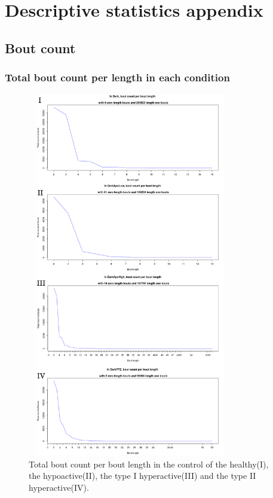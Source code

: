 \appendix
\newpage
\section{Descriptive statistics appendix}
\subsection{Bout count}

\subsubsection{Total bout count per length in each condition}

\begin{figure}[h!]
\begin{center}
\includegraphics[width=9cm,height=16cm]{TotalBoutCount.png}
\caption{Total bout count per bout length in the control of the healthy(I), the hypoactive(II), the type I hyperactive(III) and the type II hyperactive(IV).}
\end{center}
\end{figure}


